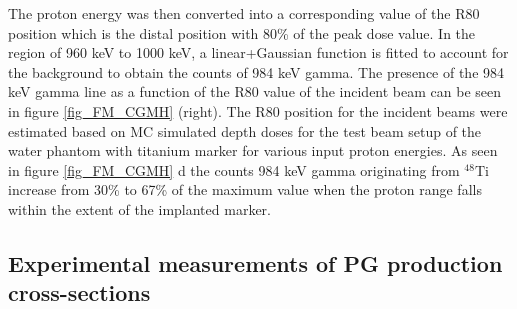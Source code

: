 \documentclass[11pt,a4paper]{article}
\begin{document}
The proton energy was then converted into a corresponding value of the R80 position which is the distal position with 80\% of the peak dose value. In the region of 960 keV to 1000 keV, a linear+Gaussian function is fitted to account for the background to obtain the counts of 984 keV gamma. The presence of the 984 keV gamma line as a function of the R80 value of the incident beam can be seen in figure \ref{fig_FM_CGMH} (right). The R80 position for the incident beams were estimated based on MC simulated depth doses for the test  beam setup of the water phantom with titanium marker for various input proton energies.  As seen in figure \ref{fig_FM_CGMH} d the counts 984 keV gamma originating from $\mathrm{^{48}Ti}$ increase from 30\% to 67\% of the maximum value when the proton range falls within the extent of the implanted marker. 

\subsection{Experimental measurements of PG production cross-sections}
\end{document}
